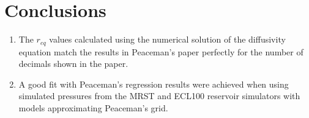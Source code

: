 \section{Conclusions} %
\label{sec:conclusions}
\begin{enumerate}
    \item The $r_{eq}$ values calculated using the numerical solution of the diffusivity equation match the results in Peaceman's paper \cite{Peaceman1978Interpretation} perfectly for the number of decimals shown in the paper.
    \item A good fit with Peaceman's regression results were achieved when using simulated pressures from the MRST and ECL100 reservoir simulators with models approximating Peaceman's grid.
\end{enumerate}
